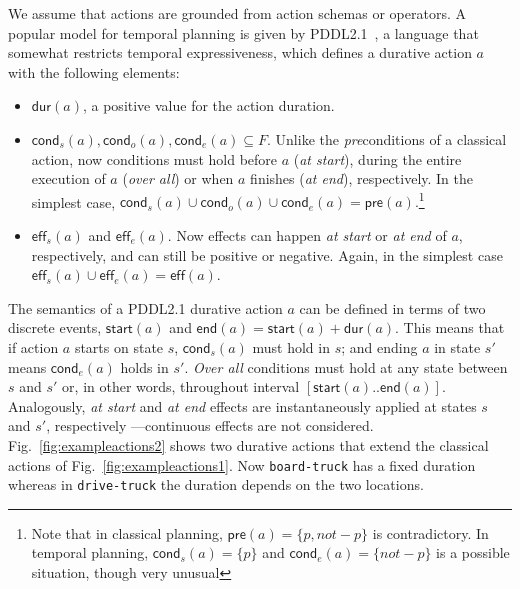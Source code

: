 \documentclass{ecai}
\newcommand{\pre}{\mathsf{pre}}    %
\newcommand{\eff}{\mathsf{eff}}    %
\newcommand{\cond}{\mathsf{cond}}  %
\newcommand{\dur}{\mathsf{dur}}    %
\newcommand{\start}{\mathsf{start}}%
\newcommand{\en}{\mathsf{end}}     %
\begin{document}
We assume that actions are grounded from action schemas or operators. A popular model for temporal planning is given by PDDL2.1~\cite{fox2003pddl2,ghallab2004automated}, a language that somewhat restricts temporal expressiveness, which defines a durative action $a$ with the following elements:

\begin{itemize}
\item $\dur(a)$, a positive value for the action duration.
\item $\cond_s(a), \cond_o(a), \cond_e(a) \subseteq F$. Unlike the \emph{pre}conditions of a classical action, now conditions must hold before $a$ ({\em at start}), during the entire execution of $a$ ({\em over all}) or when $a$ finishes ({\em at end}), respectively. In the simplest case, $\cond_s(a) \cup \cond_o(a) \cup \cond_e(a) = \pre(a).$\footnote{Note that in classical planning, $\pre(a)=\{p,not-p\}$ is contradictory. In temporal planning, $\cond_s(a)=\{p\}$ and $\cond_e(a)=\{not-p\}$ is a possible situation, though very unusual}
\item $\eff_s(a)$ and $\eff_e(a)$. Now effects can happen {\em at start} or {\em at end} of $a$, respectively, and can still be positive or negative. Again, in the simplest case $\eff_s(a) \cup \eff_e(a) = \eff(a)$.

\end{itemize}



The semantics of a PDDL2.1 durative action $a$ can be defined in terms of two discrete events, $\start(a)$ and $\en(a)=\start(a)+\dur(a)$. This means that if action $a$ starts on state $s$, $\cond_s(a)$ must hold in $s$; and ending $a$ in state $s'$ means $\cond_e(a)$ holds in $s'$. {\em Over all} conditions must hold at any state between $s$ and $s'$ or, in other words, throughout interval $[\start(a)..\en(a)]$.
Analogously, {\em at start} and {\em at end} effects are instantaneously applied at states $s$ and $s'$, respectively ---continuous effects are not considered.
Fig.~\ref{fig:exampleactions2} shows two durative actions that extend the classical actions of Fig.~\ref{fig:exampleactions1}. Now \texttt{board-truck} has a fixed duration whereas in \texttt{drive-truck} the duration depends on the two locations.
\end{document}
